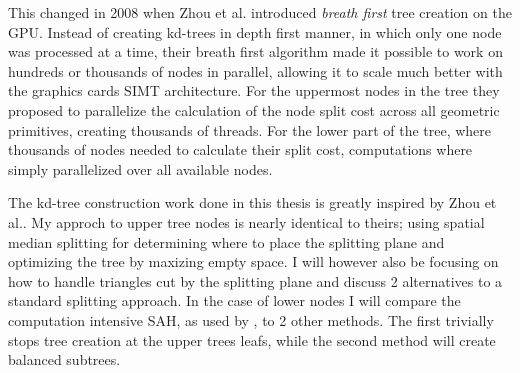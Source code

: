 
This changed in 2008 when Zhou et al. introduced
\textit{breath first} tree creation on the GPU. Instead of creating
kd-trees in depth first manner, in which only one node was processed
at a time, their breath first algorithm made it possible to work on
hundreds or thousands of nodes in parallel, allowing it to scale much
better with the graphics cards SIMT architecture. For the uppermost
nodes in the tree they proposed to parallelize the calculation of the
node split cost across all geometric primitives, creating thousands of
threads. For the lower part of the tree, where thousands of nodes
needed to calculate their split cost, computations where simply
parallelized over all available nodes.



The kd-tree construction work done in this thesis is greatly inspired
by Zhou et al.. My approch to upper tree nodes is
nearly identical to theirs; using spatial median splitting for
determining where to place the splitting plane and optimizing the tree
by maxizing empty space. I will however also be focusing on how to
handle triangles cut by the splitting plane and discuss 2 alternatives
to a standard splitting approach. In the case of lower nodes I will
compare the computation intensive SAH, as used by \zhou, to 2 other
methods. The first trivially stops tree creation at the upper trees
leafs, while the second method will create balanced subtrees.

